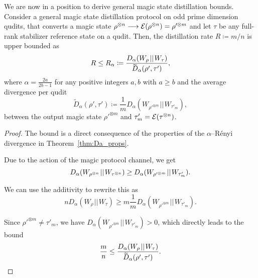 \documentclass[
twocolumn,
superscriptaddress
]{revtex4-1}
\newenvironment{customthm}[1]
  {\renewcommand\theinnercustomthm{#1}\innercustomthm}
  {\endinnercustomthm}
\def\E{{\cal E}}
\begin{document}
We are now in a position to derive general magic state distillation bounds.
\begin{customthm}{12}
	Consider a general magic state distillation protocol on odd prime dimension qudits, that converts a magic state $\rho^{\otimes n} \longrightarrow \E(\rho^{\otimes n})=\rho'^{\otimes m}$ and let $\tau$ be any full-rank stabilizer reference state on a qudit. Then, the distillation rate $R \coloneqq m/n$ is upper bounded as
	\begin{equation}
		R \leq R_\alpha \coloneqq \frac{D_{\alpha}(W_\rho \hspace{1pt}||\hspace{1pt} W_\tau)}{\rlap{\raisebox{-0.2ex}{$\widetilde{\phantom{D}}$}}D_\alpha( \rho', \tau')},
	\end{equation}
	where $\alpha = \frac{2a}{2b-1}$ for any positive integers $a,b$ with $a \geq b$ and the average divergence per qudit
	\begin{equation}
\widetilde{D}_\alpha( \rho', \tau') \coloneqq \frac{1}{m} D_\alpha (W_{\rho'^{\otimes m}} \hspace{1pt}||\hspace{1pt} W_{\tau'_m}),
\end{equation}
between the output magic state $\rho'^{\otimes m}$ and $\tau'_m = \E(\tau^{\otimes n})$.
\end{customthm}
\begin{proof}
	The bound is a direct consequence of the properties of the $\alpha$--R\'{e}nyi divergence in Theorem~\ref{thm:Da_props}.
	
Due to the action of the magic protocol channel, we get
\begin{equation}	
	D_\alpha(W_{\rho^{\otimes n}} \hspace{1pt}||\hspace{1pt} W_{\tau^{\otimes n}}) \geq D_\alpha (W_{\rho'^{\otimes m}} \hspace{1pt}||\hspace{1pt} W_{\tau'_m}).\vspace{10pt}
\end{equation}

We can use the additivity to rewrite this as
\begin{equation}
	n D_\alpha(W_\rho \hspace{1pt}||\hspace{1pt} W_\tau) \geq m \frac{1}{m}D_\alpha(W_{\rho'^{\otimes m}} \hspace{1pt}||\hspace{1pt} W_{\tau'_m}).
\end{equation}

Since $\rho'^{\otimes m} \neq \tau'_m$, we have $D_\alpha(W_{\rho'^{\otimes m}} \hspace{1pt}||\hspace{1pt} W_{\tau'_m}) > 0$, which directly leads to the bound
\begin{equation}
	\frac{m}{n} \leq \frac{D_{\alpha}(W_\rho \hspace{1pt}||\hspace{1pt} W_\tau)}{\rlap{\raisebox{-0.1ex}{$\widetilde{\phantom{D}}$}}D_\alpha( \rho', \tau')}.
\end{equation}
\end{proof}
\end{document}
